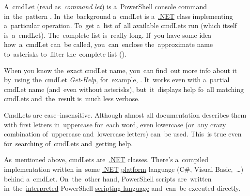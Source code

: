 \label{powershellcmdlet}
A~cmdLet (read as~\textit{command let}) is a~PowerShell console command in~the~pattern .
In~the~background a~cmdLet is a~\hyperref[dotnet]{.NET} class implementing a~particular operation.
To~get a~list of~all available cmdLets run  (which itself is~a~cmdLet).
The~complete list is~really long.
If~you have some idea how~a~cmdLet can~be called, you~can~enclose the~approximate name to~asterisks to~filter the~complete list ().

When you know the~exact cmdLet name, you~can find~out more info about it by~using the~cmdLet \textit{Get-Help}, for~example, .
It~works even with a~partial cmdLet name (and~even without asterisks), but~it~displays help fo~all matching cmdLets and~the~result is~much less verbose.

CmdLets are case--insensitive.
Although almost all documentation describes them with first letters in~uppercase for~each word, even lowercase (or~any crazy combination of~uppercase and~lowercase letters) can~be used.
This~is true even for~searching of~cmdLets and~getting help.

As~mentioned above, cmdLets are~\hyperref[dotnet]{.NET} classes.
There's a~compiled implementation written in~some \hyperref[dotnet]{.NET} \hyperref[platform]{platform} language (C\#, Visual Basic,~\dots) behind a~cmdLet.
On~the~other hand, PowerShell scripts are~written in~the~\hyperref[compiledinterpretedlanguages]{interpreted} PowerShell \hyperref[scriptinglanguages]{scripting language} and~can~be executed directly.
